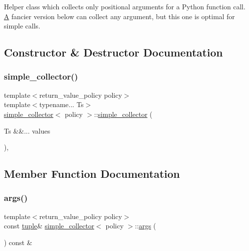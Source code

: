 Helper class which collects only positional arguments for a Python function call. \mbox{\hyperlink{struct_a}{A}} fancier version below can collect any argument, but this one is optimal for simple calls. 

\subsection{Constructor \& Destructor Documentation}
\mbox{\label{classsimple__collector_a21c964eaf130362b6044709cec9c31cf}} 
\subsubsection{\texorpdfstring{simple\_collector()}{simple\_collector()}}
{\footnotesize\ttfamily template$<$return\+\_\+value\+\_\+policy policy$>$ \\
template$<$typename... Ts$>$ \\
\mbox{\hyperlink{classsimple__collector}{simple\+\_\+collector}}$<$ policy $>$\+::\mbox{\hyperlink{classsimple__collector}{simple\+\_\+collector}} (\begin{DoxyParamCaption}\item[{Ts \&\&...}]{values }\end{DoxyParamCaption})\hspace{0.3cm}{\ttfamily [inline]}, {\ttfamily [explicit]}}



\subsection{Member Function Documentation}
\mbox{\label{classsimple__collector_a328467968ae3f57f561834780a631c36}} 
\subsubsection{\texorpdfstring{args()}{args()}\hspace{0.1cm}{\footnotesize\ttfamily [1/2]}}
{\footnotesize\ttfamily template$<$return\+\_\+value\+\_\+policy policy$>$ \\
const \mbox{\hyperlink{classtuple}{tuple}}\& \mbox{\hyperlink{classsimple__collector}{simple\+\_\+collector}}$<$ policy $>$\+::\mbox{\hyperlink{classargs}{args}} (\begin{DoxyParamCaption}{ }\end{DoxyParamCaption}) const \&\hspace{0.3cm}{\ttfamily [inline]}}

